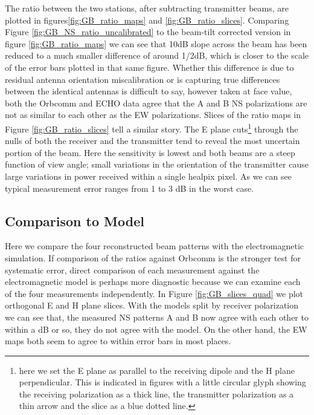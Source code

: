 \documentclass[preprint2,numberedappendix,tighten,twocolappendix]{aastex6}
\begin{document}
The ratio between the two stations, after subtracting transmitter beams, are plotted in figures\ref{fig:GB_ratio_maps} and \ref{fig:GB_ratio_slices}. Comparing Figure \ref{fig:GB_NS_ratio_uncalibrated} to the beam-tilt corrected version in figure \ref{fig:GB_ratio_maps} we can see that 10dB slope across the beam has been reduced to a much smaller difference of around 1/2dB, which is closer to the scale of the error bars plotted in that same figure. Whether this difference is due to residual antenna orientation miscalibration or is capturing true differences between the identical antennas is difficult to say, however taken at face value, both the Orbcomm and ECHO data agree that the A and B NS polarizations are not as similar to each other as the EW polarizations. Slices of the ratio maps in Figure \ref{fig:GB_ratio_slices} tell a similar story.  The E plane cuts\footnote{here we set the E plane as parallel to the receiving dipole and the H plane perpendicular.  This is indicated in figures with a little circular glyph showing the receiving polarization as a thick line, the transmitter polarization as a thin arrow and the slice as a blue dotted line.} through the nulls of both the receiver and the transmitter tend to reveal the most uncertain portion of the beam. Here the sensitivity is lowest and both beams are a steep function of view angle;  small variations in the orientation of the transmitter cause large variations in power received within a single healpix pixel.  As we can see typical measurement error ranges from 1 to 3 dB in the worst case.

\subsection{Comparison to Model}

Here we compare the four reconstructed beam patterns with the electromagnetic simulation.  If comparison of the ratios against Orbcomm is the stronger test for systematic error, direct comparison of each measurement against the electromagnetic model is perhaps more diagnostic because we can examine each of the four measurements independently. In Figure \ref{fig:GB_slices_quad} we plot orthogonal E and H plane slices. With the models split by receiver polarization we can see that, the measured NS patterns A and B now agree with each other to within a dB or so, they do not agree with the model. On the other hand, the EW maps both seem to agree to within error bars in most places.
\end{document}
